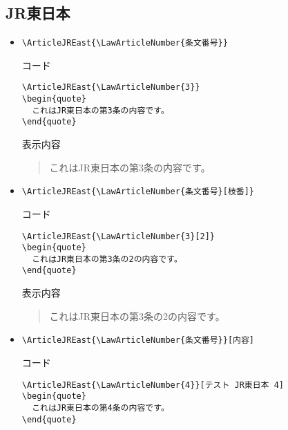 \documentclass[oneside,10pt,a4paper]{jsarticle}
\begin{document}
  \subsection{JR東日本}

  \begin{itemize}
    \item \verb|\ArticleJREast{\LawArticleNumber{条文番号}}|
      \begin{itembox}[l]{コード}
        {\footnotesize\begin{verbatim}
\ArticleJREast{\LawArticleNumber{3}}
\begin{quote}
  これはJR東日本の第3条の内容です。
\end{quote}\end{verbatim}}
      \end{itembox}
      \begin{itembox}[l]{表示内容}
        \begin{quote}
          これはJR東日本の第3条の内容です。
        \end{quote}
      \end{itembox}
    \item \verb|\ArticleJREast{\LawArticleNumber{条文番号}[枝番]}|
      \begin{itembox}[l]{コード}
        {\footnotesize\begin{verbatim}
\ArticleJREast{\LawArticleNumber{3}[2]}
\begin{quote}
  これはJR東日本の第3条の2の内容です。
\end{quote}\end{verbatim}}
      \end{itembox}
      \begin{itembox}[l]{表示内容}
        \begin{quote}
          これはJR東日本の第3条の2の内容です。
        \end{quote}
      \end{itembox}
    \newpage
    \item \verb|\ArticleJREast{\LawArticleNumber{条文番号}}[内容]|
      \begin{itembox}[l]{コード}
        {\footnotesize\begin{verbatim}
\ArticleJREast{\LawArticleNumber{4}}[テスト JR東日本 4]
\begin{quote}
  これはJR東日本の第4条の内容です。
\end{quote}\end{verbatim}}

\end{itembox}
\end{itemize}
\end{document}
